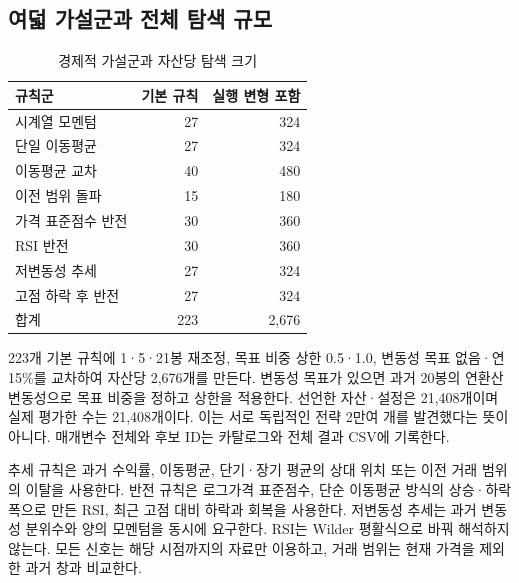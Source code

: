 \documentclass[11pt,a4paper]{article}
\begin{document}
\subsection{여덟 가설군과 전체 탐색 규모}
\begin{table}[htbp]\centering
\small
\setlength{\tabcolsep}{4pt}
\caption{경제적 가설군과 자산당 탐색 크기}
\begin{tabular}{lrr}
\toprule
규칙군 & 기본 규칙 & 실행 변형 포함 \\
\midrule
시계열 모멘텀 & 27 & 324 \\
단일 이동평균 & 27 & 324 \\
이동평균 교차 & 40 & 480 \\
이전 범위 돌파 & 15 & 180 \\
가격 표준점수 반전 & 30 & 360 \\
RSI 반전 & 30 & 360 \\
저변동성 추세 & 27 & 324 \\
고점 하락 후 반전 & 27 & 324 \\
합계 & 223 & 2,676 \\
\bottomrule
\end{tabular}
\end{table}
223개 기본 규칙에 1·5·21봉 재조정, 목표 비중 상한 0.5·1.0, 변동성 목표 없음·연 15\%를 교차하여 자산당 2,676개를 만든다. 변동성 목표가 있으면 과거 20봉의 연환산 변동성으로 목표 비중을 정하고 상한을 적용한다. 선언한 자산·설정은 21,408개이며 실제 평가한 수는 21,408개이다. 이는 서로 독립적인 전략 2만여 개를 발견했다는 뜻이 아니다. 매개변수 전체와 후보 ID는 카탈로그와 전체 결과 CSV에 기록한다.

추세 규칙은 과거 수익률, 이동평균, 단기·장기 평균의 상대 위치 또는 이전 거래 범위의 이탈을 사용한다. 반전 규칙은 로그가격 표준점수, 단순 이동평균 방식의 상승·하락 폭으로 만든 RSI, 최근 고점 대비 하락과 회복을 사용한다. 저변동성 추세는 과거 변동성 분위수와 양의 모멘텀을 동시에 요구한다. RSI는 Wilder 평활식으로 바꿔 해석하지 않는다. 모든 신호는 해당 시점까지의 자료만 이용하고, 거래 범위는 현재 가격을 제외한 과거 창과 비교한다.
\end{document}
